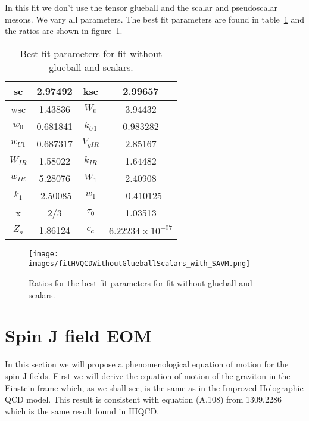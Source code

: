 \documentclass[10 pt]{article}
\begin{document}
In this fit we don't use the tensor glueball and the scalar and pseudoscalar mesons. We vary all parameters. The best fit parameters are found in table~\ref{table: fit without glueball scalars} and the ratios are shown in figure~\ref{figure: fit without glueball scalars}.

\begin{table}
\centering
\begin{tabular}{ | c | c | c | c |}
\hline
sc & 2.97492 & ksc & 2.99657 \\
\hline
wsc & 1.43836 & $W_0$ & 3.94432 \\
\hline
$w_0$ & 0.681841 & $k_{U1}$ & 0.983282  \\
\hline
$w_{U1}$ & 0.687317 & $V_{gIR}$ & 2.85167 \\
\hline
$W_{IR}$ & 1.58022 & $k_{IR}$ & 1.64482 \\
\hline
$w_{IR}$ & 5.28076 & $W_1$ & 2.40908 \\
\hline
$k_1$ & -2.50085 & $w_1$ & - 0.410125 \\
\hline
x & 2/3 & $\tau_0$ & 1.03513 \\
\hline
$Z_a$ & 1.86124 & $c_a$ & $6.22234 \times 10^{-07}$ \\
\hline
\end{tabular}
\caption{Best fit parameters for fit without glueball and scalars.}
\label{table: fit without glueball scalars} 
\end{table}



\begin{figure}
  \center
  \texttt{[image: images/fitHVQCDWithoutGlueballScalars\_with\_SAVM.png]} 
  \caption{Ratios for the best fit parameters for fit without glueball and scalars.}
   \label{figure: fit without glueball scalars}
\end{figure}


\section{Spin J field EOM}

In this section we will propose a phenomenological equation of motion for the spin J fields. First we will derive the equation of motion of the graviton in the Einstein frame which, as we shall see, is the same as in the Improved Holographic QCD model. This result is consistent with equation (A.108) from 1309.2286 which is the same result found in IHQCD.
\end{document}
